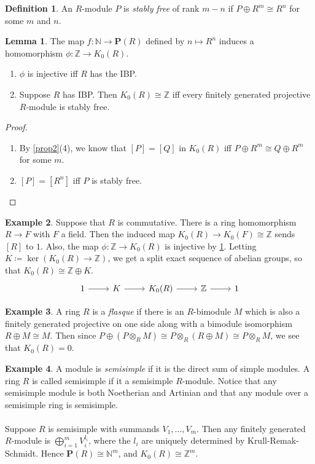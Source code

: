 \documentclass[10pt,letterpaper,cm]{nupset}
\theoremstyle{definition}
\newtheorem{definition}{Definition}
\newtheorem{exmp}[definition]{Example}
\theoremstyle{theorem}
\newtheorem{lemma}[theorem]{Lemma}
\theoremstyle{remark}
\newcommand{\N}{\mathbb N}
\renewcommand{\P}{\mathbf P}
\newcommand{\Z}{\mathbb Z}
\newcommand{\1}{\mathbf{1}}
\newcommand{\0}{\vec 0}
\begin{document}
\begin{definition}
An $R$-module $P$ is \textit{stably free} of rank $m-n$ if $P \oplus R^m \cong R^n$ for some $m$ and $n$.
\end{definition}

\begin{lemma}\label{L4}
The map $f: \N \to \P(R)$ defined by $n \mapsto R^n$ induces a homomorphism $\phi : \Z \to K_0(R)$.
\begin{enumerate}
\item $\phi$ is injective iff $R$ has the IBP.
\item Suppose $R$ has IBP. Then $K_0(R) \cong \Z$ iff every finitely generated projective $R$-module is stably free.
\end{enumerate}
\end{lemma}
\begin{proof} $ $
\begin{enumerate}
\item By \cref{prop2}(4), we know that $[P] = [Q]$ in $K_0(R)$ iff $P\oplus R^m \cong Q\oplus R^m$ for some $m$. 
\item $[P]= [R^n]$ iff $P$ is stably free.
\end{enumerate}
\end{proof}


\begin{exmp}
Suppose that $R$ is commutative. There is a ring homomorphism $R\to F$ with $F$ a field. Then the induced map $K_0(R) \to K_0(F) \cong \Z$ sends $[R]$ to $1$. Also, the map $\phi : \Z \to K_0(R)$ is injective by \cref{L4}. Letting $K\coloneqq \ker(K_0(R) \to \Z)$, we get a split exact sequence of abelian groups, so that $K_0(R) \cong \Z \oplus K$.
\[
\begin{tikzcd}
1 \arrow[r] & K \arrow[r] & K_0(R) \arrow[r] & \mathbb Z \arrow[r] & 1
\end{tikzcd}
\]
\end{exmp}

\begin{exmp}
A ring $R$ is a \textit{flasque} if there is an $R$-bimodule $M$ which is also a finitely generated projective on one side along with a bimodule isomorphism $R\oplus M \cong M$. Then since $P \oplus (P \otimes_R M) \cong P \otimes_R (R \oplus M) \cong P \otimes_R M$, we see that $K_0(R) =0$.
\end{exmp}

\begin{exmp}
A module is \textit{semisimple} if it is the direct sum of simple modules. A ring $R$ is called semisimple if it a semisimple $R$-module. Notice that any semisimple module is both Noetherian and Artinian and that any module over a semisimple ring is semisimple. \\ \\ Suppose $R$ is semisimple with summands $V_1, \ldots, V_m$. Then any finitely generated $R$-module is $\bigoplus_{i=1}^m V_i^{l_i}$, where the $l_i$ are uniquely determined by Krull-Remak-Schmidt. Hence $\P(R) \cong \N^m$, and $K_0(R) \cong \Z^m$.
\end{exmp}
\end{document}
